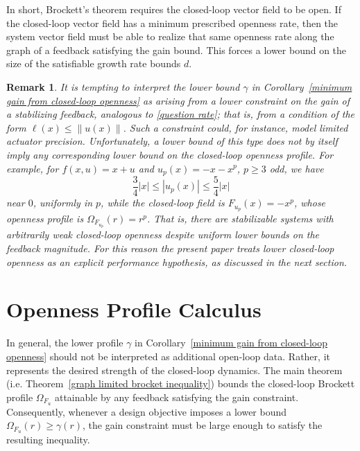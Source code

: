 \documentclass[pdflatex,sn-mathphys-num]{sn-jnl}%
\theoremstyle{thmstyleone}%
\theoremstyle{thmstyletwo}%
\newtheorem{remark}{Remark}%
\theoremstyle{thmstylethree}%
\begin{document}

    In short, Brockett’s theorem requires the closed-loop vector field to be open. If the closed-loop vector field has a minimum prescribed openness rate, then the system vector field must be able to realize that same openness rate along the graph of a feedback satisfying the gain bound. This forces a lower bound on the size of the satisfiable growth rate bounds $d$.

    
    \begin{remark}
        It is tempting to interpret the lower bound $\gamma$ in Corollary~\ref{minimum gain from closed-loop openness} as arising from a lower constraint on the gain of a stabilizing feedback, analogous to \eqref{question rate}; that is, from a condition of the form $\ell(x)\leq \|u(x)\|$. Such a constraint could, for instance, model limited actuator precision. Unfortunately, a lower bound of this type does not by itself imply any corresponding lower bound on the closed-loop openness profile. For example, for $f(x,u)=x+u$ and $u_p(x)=-x-x^p$, $p\geq 3$ odd, we have
        \[
        \frac{3}{4}|x|\leq |u_p(x)|\leq \frac{5}{4}|x|
        \]
        near $0$, uniformly in $p$, while the closed-loop field is $F_{u_p}(x)=-x^p$, whose openness profile is $\Omega_{F_{u_p}}(r)=r^p$. That is, there are stabilizable systems with arbitrarily weak closed-loop openness despite uniform lower bounds on the feedback magnitude.  For this reason the present paper treats lower closed-loop openness as an explicit performance hypothesis, as discussed in the next section.
    \end{remark}

    

\section{Openness Profile Calculus}


    
    In general, the lower profile $\gamma$ in Corollary~\ref{minimum gain from closed-loop openness} should not be interpreted as additional open-loop data.  Rather, it represents the desired strength of the closed-loop dynamics. The main theorem (i.e. Theorem~\ref{graph limited brocket inequality}) bounds the closed-loop Brockett profile $\Omega_{F_u}$ attainable by any feedback satisfying the gain constraint. Consequently, whenever a design objective imposes a lower bound $\Omega_{F_u}(r)\geq \gamma(r)$, the gain constraint must be large enough to satisfy the resulting inequality.
    
\end{document}
